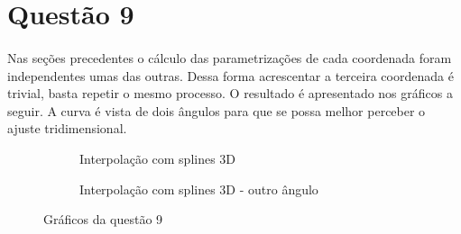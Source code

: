 \section*{Questão 9}

\paragraph{}Nas seções precedentes o cálculo das parametrizações de cada coordenada
foram independentes umas das outras. Dessa forma acrescentar a terceira coordenada
é trivial, basta repetir o mesmo processo. O resultado é apresentado nos gráficos a 
seguir. A curva é vista de dois ângulos para que se possa melhor perceber o ajuste 
tridimensional.

\FloatBarrier
\begin{figure}[!htp]
	\begin{subfigure}[!htp]{0.5\textwidth}
	
	\caption{Interpolação com splines 3D }
	\label{fig:quest9-1}
	\end{subfigure}
	
	\begin{subfigure}[!htp]{0.5\textwidth}	
	
	\caption{Interpolação com splines 3D - outro ângulo }
	\label{fig:quest9-2}
	\end{subfigure}
	\caption{Gráficos da questão 9}
\end{figure}
\FloatBarrier
